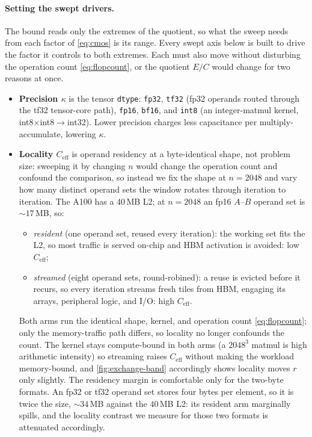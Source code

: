 \documentclass{article}
\theoremstyle{plain}
\theoremstyle{definition}
\theoremstyle{remark}
\begin{document}
\paragraph{Setting the swept drivers.}
The bound reads only the extremes of the quotient, so what
the sweep needs from each factor of \cref{eq:cmos} is its range. Every swept axis below is built to drive the factor it controls to both extremes.
Each must also move without disturbing the operation count
\cref{eq:flopcount}, or the quotient $E/C$ would change for two reasons at
once.
\begin{itemize}
	\item \textbf{Precision $\kappa$} is the tensor \texttt{dtype}:
	\texttt{fp32}, \texttt{tf32} (fp32 operands routed through the tf32
	tensor-core path), \texttt{fp16}, \texttt{bf16}, and \texttt{int8} (an
	integer-matmul kernel, int8$\times$int8$\to$int32). Lower precision
	charges less capacitance per multiply-accumulate, lowering $\kappa$.
	\item \textbf{Locality $C_{\mathrm{eff}}$} is operand residency
	at a byte-identical shape, not problem size: sweeping it by changing $n$
	would change the operation count and confound the comparison, so instead
	we fix the shape at $n = 2048$ and vary how many distinct operand sets
	the window rotates through iteration to iteration. The A100 has a
	40\,MB L2; at $n = 2048$ an fp16 $A$--$B$ operand set is ${\sim}17$\,MB,
	so:
	\begin{itemize}
		\item \emph{resident} (one operand set, reused every iteration): the
		working set fits the L2, so most traffic is served on-chip and HBM
		activation is avoided: low $C_{\mathrm{eff}}$;
		\item \emph{streamed} (eight operand sets, round-robined): a reuse is
		evicted before it recurs, so every iteration streams fresh tiles from
		HBM, engaging its arrays, peripheral logic, and I/O: high
		$C_{\mathrm{eff}}$.
	\end{itemize}
	Both arms run the identical shape, kernel, and operation count
	\cref{eq:flopcount}; only the memory-traffic path differs, so locality no
	longer confounds the count. The kernel stays compute-bound in both
	arms (a $2048^3$ matmul is high arithmetic intensity) so streaming
	raises $C_{\mathrm{eff}}$ without making the workload memory-bound, and
	\cref{fig:exchange-band} accordingly shows locality moves $r$ only
	slightly. The residency margin is comfortable only for the two-byte
	formats. An fp32 or tf32 operand set stores four bytes per element, so it
	is twice the size, ${\sim}34$\,MB against the $40$\,MB L2: its resident arm
	marginally spills, and the locality contrast we measure for those two
	formats is attenuated accordingly.
\end{itemize}
\end{document}
